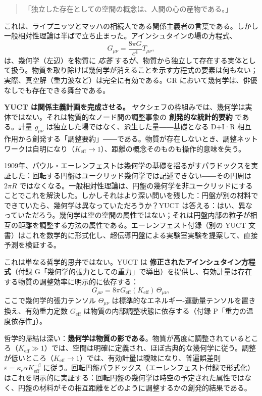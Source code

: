 \documentclass[12pt,a4paper]{article}
\begin{document}
	\begin{quote}
		「独立した存在としての空間の概念は、人間の心の産物である。」
	\end{quote}
	
	これは、ライプニッツとマッハの相続人である関係主義者の言葉である。しかし一般相対性理論は半ばで立ち止まった。アインシュタインの場の方程式、
	\[
	G_{\mu\nu} = \frac{8\pi G}{c^4} T_{\mu\nu},
	\]
	は、幾何学（左辺）を物質に \emph{応答} するが、物質から独立して存在する実体として扱う。物質を取り除けば幾何学が消えることを示す方程式の要素は何もない；実際、真空解（重力波など）は完全に有効である。GR において幾何学は、俳優なしでも存在できる舞台である。
	
	\textbf{YUCT は関係主義計画を完成させる。} ヤクシェフの枠組みでは、幾何学は実体ではない。それは物質的なノード間の調整事象の \textbf{創発的な統計的要約} である。計量 \(g_{\mu\nu}\) は独立した場ではなく、派生した量――基礎となる D+I·R 相互作用から創発する「調整要約」――である。物質が存在しないとき、調整ネットワークは自明になり（\(K_{\mathrm{eff}} \to 1\)）、距離の概念そのものも操作的意味を失う。
	
	1909年、パウル・エーレンフェストは幾何学の基礎を揺るがすパラドックスを実証した：回転する円盤はユークリッド幾何学では記述できない――その円周は \(2\pi R\) ではなくなる。一般相対性理論は、円盤の幾何学を非ユークリッドにすることでこれを解決した。しかしそれはより深い問いを残した：円盤が別の材料でできていたら、幾何学は異なっていただろうか？YUCT は答える：はい、異なっていただろう。幾何学は空の空間の属性ではない；それは円盤内部の粒子が相互の距離を調整する方法の属性である。エーレンフェスト付録（別の YUCT 文書）はこれを数学的に形式化し、超伝導円盤による実験室実験を提案して、直接予測を検証する。
	
	これは単なる哲学的思弁ではない。YUCT は \textbf{修正されたアインシュタイン方程式}（付録 G「幾何学的張力としての重力」で導出）を提供し、有効計量は存在する物質の調整効率に明示的に依存する：
	\[
	G_{\mu\nu} = 8\pi G_{\mathrm{eff}}(K_{\mathrm{eff}}) \, \Theta_{\mu\nu},
	\]
	ここで幾何学的張力テンソル \(\Theta_{\mu\nu}\) は標準的なエネルギー-運動量テンソルを置き換え、有効重力定数 \(G_{\mathrm{eff}}\) は物質の内部調整状態に依存する（付録 P「重力の温度依存性」）。
	
	哲学的帰結は深い：\textbf{幾何学は物質の影である}。物質が高度に調整されているところ（\(K_{\mathrm{eff}} \gg 1\)）では、空間は明確に定義され、ほぼ古典的な幾何学に従う。調整が低いところ（\(K_{\mathrm{eff}} \to 1\)）では、有効計量は曖昧になり、普遍誤差則 \(\varepsilon = \kappa_c \alpha K_{\mathrm{eff}}^{-\beta}\) に従う。回転円盤パラドックス（エーレンフェスト付録で形式化）はこれを明示的に実証する：回転円盤の幾何学は時空の予定された属性ではなく、円盤の材料がその相互距離をどのように調整するかの創発的結果である。
	
\end{document}
